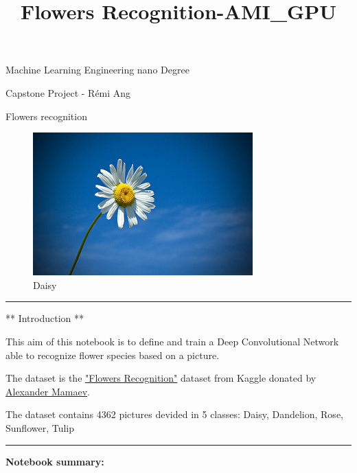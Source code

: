 \documentclass[11pt]{article}
\title{Flowers Recognition-AMI\_GPU}
\makeatletter
\def\maxwidth{\ifdim\Gin@nat@width>\linewidth\linewidth
    \else\Gin@nat@width\fi}
\let\Oldincludegraphics\includegraphics
\renewcommand{\includegraphics}[1]{\Oldincludegraphics[width=.8\maxwidth]{#1}}
\makeatother
\begin{document}
    
    
    \maketitle
    
    

    
    Machine Learning Engineering nano Degree

Capstone Project - Rémi Ang

Flowers recognition

\begin{figure}
\centering
\includegraphics{./images_samples/813445367_187ecf080a_n.jpg}
\caption{Daisy}
\end{figure}

\begin{center}\rule{0.5\linewidth}{\linethickness}\end{center}

** Introduction **

This aim of this notebook is to define and train a Deep Convolutional
Network able to recognize flower species based on a picture.

The dataset is the
\href{https://www.kaggle.com/alxmamaev/flowers-recognition}{"Flowers
Recognition"} dataset from Kaggle donated by
\href{https://www.kaggle.com/alxmamaev}{Alexander Mamaev}.

The dataset contains 4362 pictures devided in 5 classes: Daisy,
Dandelion, Rose, Sunflower, Tulip

\begin{center}\rule{0.5\linewidth}{\linethickness}\end{center}

\textbf{Notebook summary:}
\end{document}
